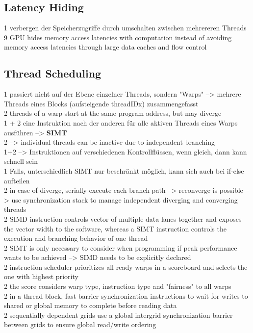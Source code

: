 \documentclass[a4paper,12pt]{llncs}
\numberwithin{equation}{section}
\begin{document}
\subsection{Latency Hiding}
  1 verbergen der Speicherzugriffe durch umschalten zwischen mehrereren Threads
  9 GPU hides memory access latencies with computation instead of avoiding memory access latencies through large data caches and flow control


\subsection{Thread Scheduling}
    1 passiert nicht auf der Ebene einzelner Threads, sondern "Warps" --> mehrere Threads eines Blocks (aufsteigende threadIDx) zusammengefasst\\
    2 threads of a warp start at the same program address, but may diverge\\
    1 + 2 eine Instruktion nach der anderen für alle aktiven Threads eines Warps ausführen --> \textbf{SIMT}\\
    2 --> individual threads can be inactive due to independent branching\\
    1+2 --> Instruktionen auf verschiedenen Kontrollflüssen, wenn gleich, dann kann schnell sein\\
      1 Falls, unterschiedlich SIMT nur beschränkt möglich, kann sich auch bei if-else aufteilen\\
      2 in case of diverge, serially execute each branch path --> reconverge is possible --> use synchronization stack to manage independent diverging and converging threads\\
      2 SIMD instruction controls vector of multiple data lanes together and exposes the vector width to the software, whereas a SIMT instruction controls the execution and branching behavior of one thread\\
      2 SIMT is only necessary to consider when programming if peak performance wants to be achieved --> SIMD needs to be explicitly declared\\

    2 instruction scheduler prioritizes all ready warps in a scoreboard and selects the one with highest priority\\
    2 the score considers warp type, instruction type and "fairness" to all warps\\

    2 in a thread block, fast barrier synchronization instructions to wait for writes to shared or global memory to complete before reading data\\
    2 sequentially dependent grids use a global intergrid synchronization barrier between grids to ensure global read/write ordering\\
   
\end{document}
